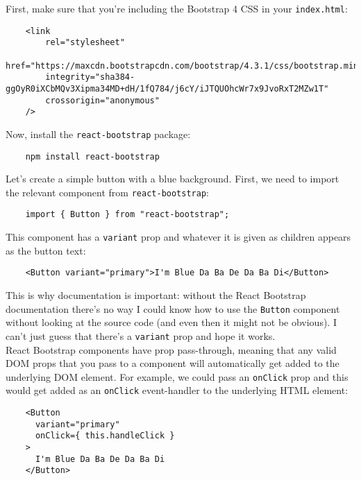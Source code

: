 First, make sure that you're including the Bootstrap 4 CSS in your \texttt{index.html}:

\begin{verbatim}
    <link
        rel="stylesheet"
        href="https://maxcdn.bootstrapcdn.com/bootstrap/4.3.1/css/bootstrap.min.css"
        integrity="sha384-ggOyR0iXCbMQv3Xipma34MD+dH/1fQ784/j6cY/iJTQUOhcWr7x9JvoRxT2MZw1T"
        crossorigin="anonymous"
    />
\end{verbatim}

Now, install the \texttt{react-bootstrap} package:

\begin{verbatim}
    npm install react-bootstrap
\end{verbatim}

Let's create a simple button with a blue background. First, we need to import the relevant component from \texttt{react-bootstrap}:

\begin{verbatim}
    import { Button } from "react-bootstrap";
\end{verbatim}

This component has a \texttt{variant} prop and whatever it is given as children appears as the button text:

\begin{verbatim}
    <Button variant="primary">I'm Blue Da Ba De Da Ba Di</Button>
\end{verbatim}

This is why documentation is important: without the React Bootstrap documentation there's no way I could know how to use the \texttt{Button} component without looking at the source code (and even then it might not be obvious). I can't just guess that there's a \texttt{variant} prop and hope it works.
\\

React Bootstrap components have prop pass-through, meaning that any valid DOM props that you pass to a component will automatically get added to the underlying DOM element. For example, we could pass an \texttt{onClick} prop and this would get added as an \texttt{onClick} event-handler to the underlying HTML element:

\begin{verbatim}
    <Button
      variant="primary"
      onClick={ this.handleClick }
    >
      I'm Blue Da Ba De Da Ba Di
    </Button>
\end{verbatim}

